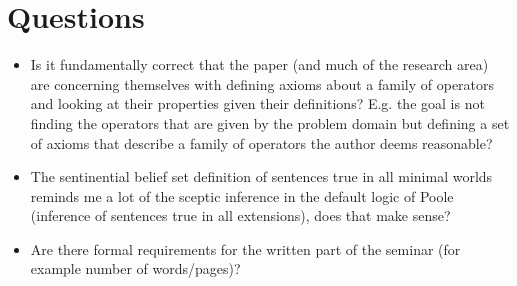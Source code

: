 \documentclass[11pt]{article}
\begin{document}
\section{Questions}
\begin{itemize}
    \item Is it fundamentally correct that the paper (and much of the research area) are concerning themselves with defining axioms about a family of operators and looking at their properties given their definitions? E.g. the goal is not finding the operators that are given by the problem domain but defining a set of axioms that describe a family of operators the author deems reasonable?
    \item The sentinential belief set definition of sentences true in all minimal worlds reminds me a lot of the sceptic inference in the default logic of Poole (inference of sentences true in all extensions), does that make sense?
    \item Are there formal requirements for the written part of the seminar (for example number of words/pages)?
\end{itemize}

\newpage

\printglossaries

\typeout{}



%
\end{document}

